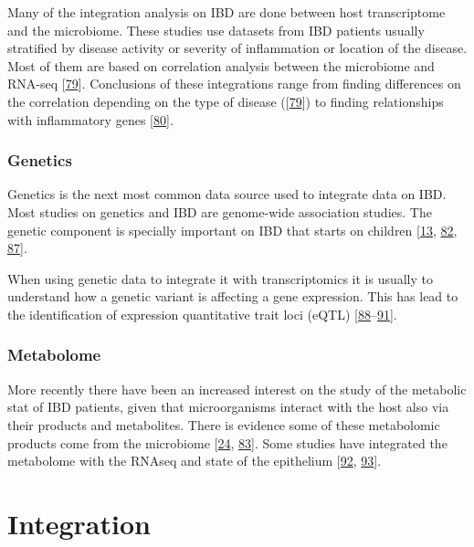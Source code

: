 \documentclass[
  12pt,
  a4paper,
  twoside,
  openright]{book}
\begin{document}
Many of the integration analysis on IBD are done between host transcriptome and the microbiome.
These studies use datasets from IBD patients usually stratified by disease activity or severity of inflammation or location of the disease.
Most of them are based on correlation analysis between the microbiome and RNA-seq {[}\protect\hyperlink{ref-hasler_uncoupling_2016}{79}{]}.
Conclusions of these integrations range from finding differences on the correlation depending on the type of disease ({[}\protect\hyperlink{ref-hasler_uncoupling_2016}{79}{]}) to finding relationships with inflammatory genes {[}\protect\hyperlink{ref-tang2017}{80}{]}.

\hypertarget{genetics-1}{%
\subsubsection{Genetics}\label{genetics-1}}

Genetics is the next most common data source used to integrate data on IBD.
Most studies on genetics and IBD are genome-wide association studies.
The genetic component is specially important on IBD that starts on children {[}\protect\hyperlink{ref-kumar2019}{13}, \protect\hyperlink{ref-huWholeExomeSequencing2021}{82}, \protect\hyperlink{ref-knights2013}{87}{]}.

When using genetic data to integrate it with transcriptomics it is usually to understand how a genetic variant is affecting a gene expression.
This has lead to the identification of expression quantitative trait loci (eQTL) {[}\protect\hyperlink{ref-repnik2016}{88}--\protect\hyperlink{ref-dai2019}{91}{]}.

\hypertarget{metabolome}{%
\subsubsection{Metabolome}\label{metabolome}}

More recently there have been an increased interest on the study of the metabolic stat of IBD patients, given that microorganisms interact with the host also via their products and metabolites.
There is evidence some of these metabolomic products come from the microbiome {[}\protect\hyperlink{ref-ferrer-picuxf3n2020}{24}, \protect\hyperlink{ref-mayorgas2021}{83}{]}.
Some studies have integrated the metabolome with the RNAseq and state of the epithelium {[}\protect\hyperlink{ref-ahmed2016}{92}, \protect\hyperlink{ref-gallagher2021}{93}{]}.

\hypertarget{integration}{%
\section{Integration}\label{integration}}
\end{document}
